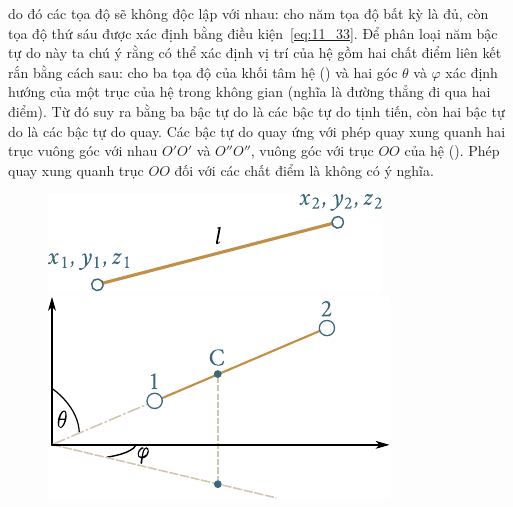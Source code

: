 \noindent
do đó các tọa độ sẽ không độc lập với nhau: cho năm tọa độ bất kỳ là đủ, còn tọa độ thứ sáu được xác định bằng điều kiện~\eqref{eq:11_33}. Để phân loại năm bậc tự do này ta chú ý rằng có thể xác định vị trí của hệ gồm hai chất điểm liên kết rắn bằng cách sau: cho ba tọa độ của khối tâm hệ () và hai góc $\theta$ và $\varphi$ xác định hướng của một trục của hệ trong không gian (nghĩa là đường thẳng đi qua hai điểm). Từ đó suy ra bằng ba bậc tự do là các bậc tự do tịnh tiến, còn hai bậc tự do là các bậc tự do quay. Các bậc tự do quay ứng với phép quay xung quanh hai trục vuông góc với nhau $O'O'$ và $O''O''$, vuông góc với trục $OO$ của hệ (). Phép quay xung quanh trục $OO$ đối với các chất điểm là không có ý nghĩa.

\begin{figure}[!htb]
	\begin{minipage}[t]{0.5\linewidth}
		\begin{center}
			\includegraphics[scale=1.0]{figures/ch_11/fig_11_9.pdf}
			\caption[]{}
			\label{fig:11_9}
		\end{center}
	\end{minipage}
	\hspace{-0.05cm}
	\begin{minipage}[t]{0.5\linewidth}
		\begin{center}
			\includegraphics[scale=1.0]{figures/ch_11/fig_11_10.pdf}
			\caption[]{}
			\label{fig:11_10}
		\end{center}
	\end{minipage}
\end{figure}

